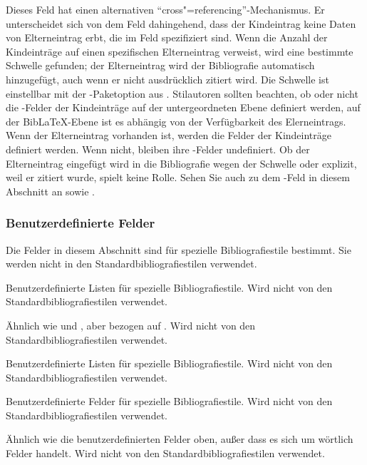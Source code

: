\documentclass{ltxdockit}[2011/03/25]
\newcommand*{\biblatex}{BibLaTeX\xspace}
\begin{document}
\begin{fieldlist}

Dieses Feld hat einen alternativen "`cross"=referencing"'-Mechanismus. 
Er unterscheidet sich von dem Feld  dahingehend, dass 
der Kindeintrag
keine Daten von Elterneintrag erbt, die im Feld  spezifiziert sind.
Wenn die Anzahl der Kindeinträge auf einen spezifischen Elterneintrag verweist, 
wird eine bestimmte Schwelle gefunden; der Elterneintrag wird der Bibliografie automatisch hinzugefügt, auch wenn er nicht ausdrücklich zitiert wird. Die Schwelle ist einstellbar mit der -Paketoption aus .
Stilautoren sollten beachten, ob oder nicht die -Felder
der Kindeinträge auf der untergeordneten Ebene definiert werden, auf der
\biblatex-Ebene ist es abhängig von der Verfügbarkeit des Elerneintrags. Wenn der
Elterneintrag vorhanden ist, werden die Felder der Kindeinträge
definiert werden. Wenn nicht, bleiben ihre -Felder undefiniert. Ob der
Elterneintrag eingefügt wird in die Bibliografie wegen der Schwelle oder explizit, weil er zitiert wurde, spielt keine Rolle. Sehen Sie auch zu dem 
-Feld in diesem Abschnitt an sowie .

\end{fieldlist}

\subsubsection{Benutzerdefinierte Felder} \label{bib:fld:ctm}

Die Felder in diesem Abschnitt sind für spezielle Bibliografiestile bestimmt.
Sie werden nicht in den Standardbibliografiestilen verwendet.

\begin{fieldlist}


Benutzerdefinierte Listen für spezielle Bibliografiestile. Wird nicht von den
Standardbibliografiestilen verwendet.


Ähnlich wie  und , aber bezogen auf
. Wird nicht von den Standardbibliografiestilen
verwendet.


Benutzerdefinierte Listen für spezielle Bibliografiestile. Wird nicht von den
Standardbibliografiestilen verwendet.


Benutzerdefinierte Felder für spezielle Bibliografiestile. Wird nicht von den
Standardbibliografiestilen verwendet.


Ähnlich wie die benutzerdefinierten Felder oben, außer dass es sich um wörtlich
Felder handelt. Wird nicht von den Standardbibliografiestilen verwendet.

\end{fieldlist}
\end{document}
